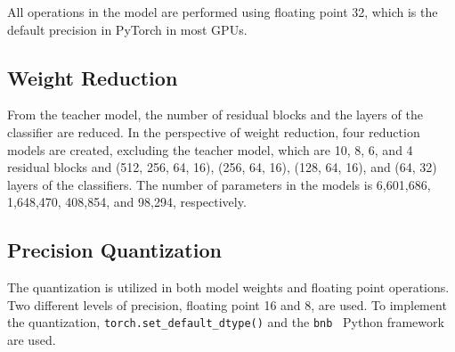 All operations in the model are performed using floating point 32,
which is the default precision in PyTorch \cite{paszke2019pytorch}
in most GPUs.

\subsection{Weight Reduction}
\label{sec:method:weight_reduction}

From the teacher model,
the number of residual blocks and the layers of the classifier are reduced.
In the perspective of weight reduction,
four reduction models are created, excluding the teacher model,
which are 10, 8, 6, and 4 residual blocks
and (512, 256, 64, 16), (256, 64, 16), (128, 64, 16), and (64, 32) layers of the classifiers.
The number of parameters in the models is 6,601,686, 1,648,470, 408,854, and 98,294, respectively.

\subsection{Precision Quantization}
\label{sec:method:precision_quantization}

The quantization is utilized in both model weights and floating point operations.
Two different levels of precision, floating point 16 and 8, are used.
To implement the quantization,
\texttt{torch.set\_default\_dtype()} and the \texttt{bnb}~\cite{bitsandbytes} Python framework
are used.